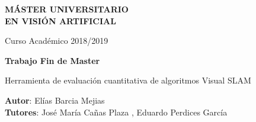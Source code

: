 \thispagestyle{empty}
\vspace{5cm}

\begin{figure}[htb]
  \centerline{}
\end{figure}

\begin{center}
  {\large {\bf MÁSTER UNIVERSITARIO\\ EN VISIÓN ARTIFICIAL}}
  \vspace{5mm}
 
  {\large {Curso Académico 2018/2019}}

  \vspace{2cm}

  {\large {\bf  Trabajo Fin de Master}}

  \vspace{3cm}

  {\Large {{\Huge { Herramienta de evaluación cuantitativa de algoritmos Visual SLAM }} \\[1cm] }}




  \vspace{5cm}
  {\bf Autor}: Elías Barcia Mejias\\
  {\bf Tutores}: José María Cañas Plaza , Eduardo Perdices García
\end{center}
